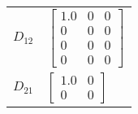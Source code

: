 \begin{tabular}{cl}
 $D_{12}$ & $\left[\begin{matrix}1.0 & 0 & 0\\0 & 0 & 0\\0 & 0 & 0\\0 & 0 & 0\end{matrix}\right]$                                                                                      \\
 $D_{21}$ & $\left[\begin{matrix}1.0 & 0\\0 & 0\end{matrix}\right]$                                                                                                                    \\
\hline
\end{tabular}